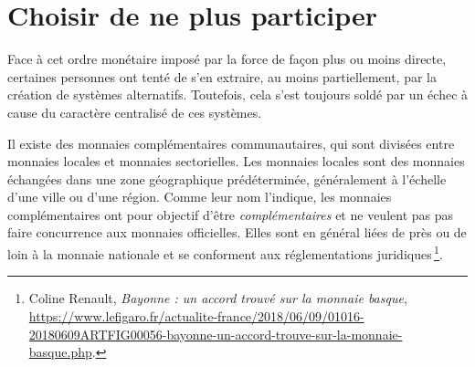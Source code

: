 \documentclass[a4paper,notitlepage]{article}
\newcommand{\sfootnote}{\,\footnote}
\begin{document}

\section{Choisir de ne plus participer} %

Face à cet ordre monétaire imposé par la force de façon plus ou moins directe, certaines personnes ont tenté de s'en extraire, au moins partiellement, par la création de systèmes alternatifs. Toutefois, cela s'est toujours soldé par un échec à cause du caractère centralisé de ces systèmes.




Il existe des monnaies complémentaires communautaires, qui sont divisées entre monnaies locales et monnaies sectorielles. Les monnaies locales sont des monnaies échangées dans une zone géographique prédéterminée, généralement à l'échelle d'une ville ou d'une région. Comme leur nom l'indique, les monnaies complémentaires ont pour objectif d'être \emph{complémentaires} et ne veulent pas pas faire concurrence aux monnaies officielles. Elles sont en général liées de près ou de loin à la monnaie nationale et se conforment aux réglementations juridiques\sfootnote{Coline Renault, \emph{Bayonne : un accord trouvé sur la monnaie basque}, \url{https://www.lefigaro.fr/actualite-france/2018/06/09/01016-20180609ARTFIG00056-bayonne-un-accord-trouve-sur-la-monnaie-basque.php}.}.
\end{document}
